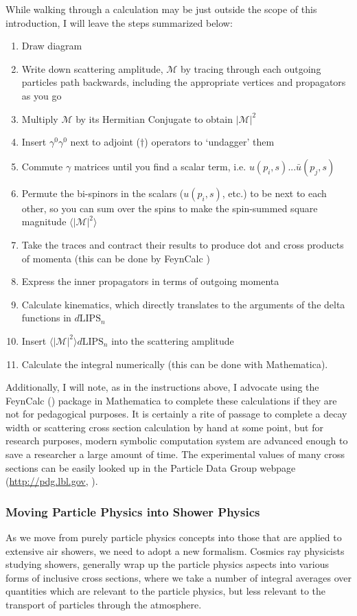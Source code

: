 While walking through a calculation may be just outside the scope of this introduction, I will leave the steps summarized below:
\begin{enumerate}
\item Draw diagram
\item Write down scattering amplitude, $\mathcal{M}$ by tracing through each outgoing particles path backwards, including the appropriate vertices and propagators as you go
\item Multiply $\mathcal{M}$ by its Hermitian Conjugate to obtain $|\mathcal{M}|^2$
\item Insert $\gamma^0\gamma^0$ next to adjoint ($\dagger$) operators to `undagger' them
\item Commute $\gamma$ matrices until you find a scalar term, i.e. $u(p_i,s)...\bar{u}(p_j,s)$
\item Permute the bi-spinors in the scalars ($u(p_i,s)$, etc.) to be next to each other, so you can sum over the spins to make the spin-summed square magnitude $\langle |\mathcal{M}|^2\rangle$
\item Take the traces and contract their results to produce dot and cross products of momenta (this can be done by FeynCalc \cite{feyncalc1,feyncalc2})
\item Express the inner propagators in terms of outgoing momenta
\item Calculate kinematics, which directly translates to the arguments of the delta functions in $d\mbox{LIPS}_n$
\item Insert $\langle |\mathcal{M}|^2\rangle d\mbox{LIPS}_n$ into the scattering amplitude
\item Calculate the integral numerically (this can be done with Mathematica).
\end{enumerate}
Additionally, I will note, as in the instructions above, I advocate using the FeynCalc (\cite{feyncalc1,feyncalc2}) package in Mathematica to complete these calculations if they are not for pedagogical purposes. It is certainly a rite of passage to complete a decay width or scattering cross section calculation by hand at some point, but for research purposes, modern symbolic computation system are advanced enough to save a researcher a large amount of time. The experimental values of many cross sections can be easily looked up in the Particle Data Group webpage (\url{http://pdg.lbl.gov}, \textcite{pdg}). 
\subsubsection{Moving Particle Physics into Shower Physics}
As we move from purely particle physics concepts into those that are applied to extensive air showers, we need to adopt a new formalism. Cosmics ray physicists studying showers, generally wrap up the particle physics aspects into various forms of inclusive cross sections, where we take a number of integral averages over quantities which are relevant to the particle physics, but less relevant to the transport of particles through the atmosphere. 

